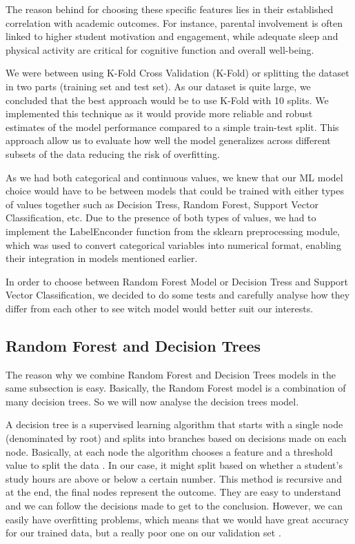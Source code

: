 \documentclass[titlepage]{article}
\begin{document}
The reason behind for choosing these specific features lies in their established correlation with academic outcomes. For instance, parental involvement is often linked to higher student motivation and engagement, while adequate sleep and physical activity are critical for cognitive function and overall well-being.

We were between using K-Fold Cross Validation (K-Fold) or splitting the dataset in two parts (training set and test set). As our dataset is quite large, we concluded that the best approach  would be to use K-Fold with 10 splits. We implemented this technique as it would provide more reliable and robust estimates of the model performance compared to a simple train-test split. This approach allow us to evaluate how well the model generalizes across different subsets of the data reducing the risk of overfitting. \cite{K-fold_Cross-Validation}

As we had both categorical and continuous values, we knew that our ML model choice would have to be between models that could be trained with either types of values together such as Decision Tress, Random Forest, Support Vector Classification, etc. Due to the presence of both types of values, we had to implement the LabelEnconder function from the sklearn preprocessing module, which was used to convert categorical variables into numerical format, enabling their integration in models mentioned earlier.\cite{ML_Model}

In order to choose between Random Forest Model or Decision Tress and Support Vector Classification, we decided to do some tests and carefully analyse how they differ from each other to see witch model would better suit our interests.

\subsection{Random Forest and Decision Trees}

\quad The reason why we combine Random Forest and Decision Trees models in the same subsection is easy. Basically, the Random Forest model is a combination of many decision trees. So we will now analyse the decision trees model. 

A decision tree is a supervised learning algorithm that starts with a single node (denominated by root) and splits into branches based on decisions made on each node. Basically, at each node the algorithm chooses a feature and a threshold value to split the data \cite{Randon_Forest}. In our case, it might split based on whether a student's study hours are above or below a certain number. This method is recursive and at the end, the final nodes represent the outcome. They are easy to understand and we can follow the decisions made to get to the conclusion. However, we can easily have overfitting problems, which means that we would have great accuracy for our trained data, but a really poor one on our validation set \cite{Random_Forest_Library}.
\end{document}
